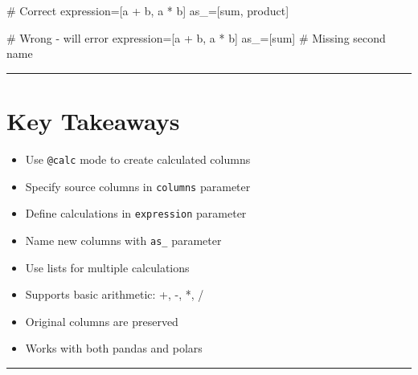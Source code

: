 \documentclass[
  letterpaper,
]{scrbook}
\newenvironment{Shaded}{\begin{snugshade}}{\end{snugshade}}
\newcommand{\CommentTok}[1]{\textcolor[rgb]{0.37,0.37,0.37}{#1}}
\newcommand{\NormalTok}[1]{\textcolor[rgb]{0.00,0.23,0.31}{#1}}
\newcommand{\OperatorTok}[1]{\textcolor[rgb]{0.37,0.37,0.37}{#1}}
\newcommand{\StringTok}[1]{\textcolor[rgb]{0.13,0.47,0.30}{#1}}
\providecommand{\tightlist}{%
  \setlength{\itemsep}{0pt}\setlength{\parskip}{0pt}}
\begin{document}
\begin{enumerate}
\begin{Shaded}
\begin{Highlighting}[]
\CommentTok{\# Correct}
\NormalTok{expression}\OperatorTok{=}\NormalTok{[}\StringTok{\textquotesingle{}a + b\textquotesingle{}}\NormalTok{, }\StringTok{\textquotesingle{}a * b\textquotesingle{}}\NormalTok{]}
\NormalTok{as\_}\OperatorTok{=}\NormalTok{[}\StringTok{\textquotesingle{}sum\textquotesingle{}}\NormalTok{, }\StringTok{\textquotesingle{}product\textquotesingle{}}\NormalTok{]}

\CommentTok{\# Wrong {-} will error}
\NormalTok{expression}\OperatorTok{=}\NormalTok{[}\StringTok{\textquotesingle{}a + b\textquotesingle{}}\NormalTok{, }\StringTok{\textquotesingle{}a * b\textquotesingle{}}\NormalTok{]}
\NormalTok{as\_}\OperatorTok{=}\NormalTok{[}\StringTok{\textquotesingle{}sum\textquotesingle{}}\NormalTok{]  }\CommentTok{\# Missing second name}
\end{Highlighting}
\end{Shaded}
\end{enumerate}

\begin{center}\rule{0.5\linewidth}{0.5pt}\end{center}

\section{Key Takeaways}\label{key-takeaways-5}

\begin{itemize}
\tightlist
\item
  Use \texttt{@calc} mode to create calculated columns
\item
  Specify source columns in \texttt{columns} parameter
\item
  Define calculations in \texttt{expression} parameter
\item
  Name new columns with \texttt{as\_} parameter
\item
  Use lists for multiple calculations
\item
  Supports basic arithmetic: +, -, *, /
\item
  Original columns are preserved
\item
  Works with both pandas and polars
\end{itemize}

\begin{center}\rule{0.5\linewidth}{0.5pt}\end{center}
\end{document}
